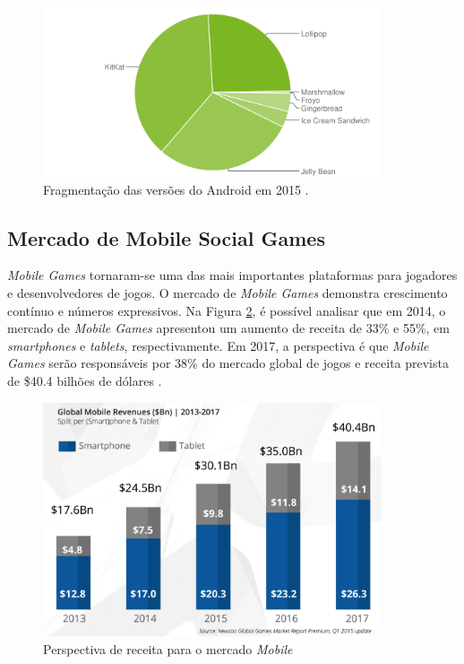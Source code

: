 \begin{figure}[h]
  \centering
  \includegraphics[width=10cm]{figuras/android_chart}
  \caption{Fragmentação das versões do Android em 2015 \cite{dashboardGoogle}.}
  \label{figura:android_chart}
\end{figure}

  \subsection{Mercado de Mobile Social Games}

\textit{Mobile Games} tornaram-se uma das mais importantes plataformas para jogadores e desenvolvedores de jogos. O mercado de \textit{Mobile Games} demonstra crescimento contínuo e números expressivos. Na Figura \ref{figura:gmgcMarket}, é possível analisar que em 2014, o mercado de \textit{Mobile Games} apresentou um aumento de receita de 33\% e 55\%, em \textit{smartphones} e \textit{tablets}, respectivamente. Em 2017, a perspectiva é que \textit{Mobile Games} serão responsáveis por 38\% do mercado global de jogos e receita prevista de \$40.4 bilhões de dólares \cite{gmgc}.

\begin{figure}[h]
  \centering
  \includegraphics[width=10cm]{figuras/gmgcMarket}
  \caption{Perspectiva de receita para o mercado \textit{Mobile} \cite{gmgc}}
  \label{figura:gmgcMarket}
\end{figure}

